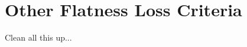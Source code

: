\documentclass{JINST}
\theoremstyle{definition}
\theoremstyle{remark}
\begin{document}
\begin{thebibliography}{9}





\end{thebibliography}

\appendix
\section{Other Flatness Loss Criteria}

Clean all this up...



\end{document}
